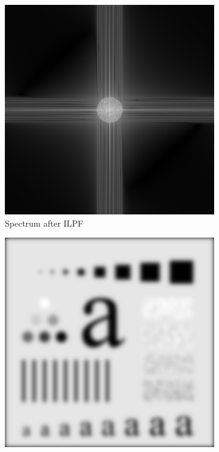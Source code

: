 \documentclass[UTF8]{ctexart}
\begin{document}
\begin{figure}[htbp]
    \begin{subfigure}{0.3\textwidth}
        \centering
        \includegraphics[width=\linewidth]{pattern_ilpf_spectrum.png}
        \caption{Spectrum after ILPF}
    \end{subfigure}
    \hfill
    \begin{subfigure}{0.3\textwidth}
        \centering
        \includegraphics[width=\linewidth]{pattern_glpf.png}

\end{subfigure}
\end{figure}
\end{document}
